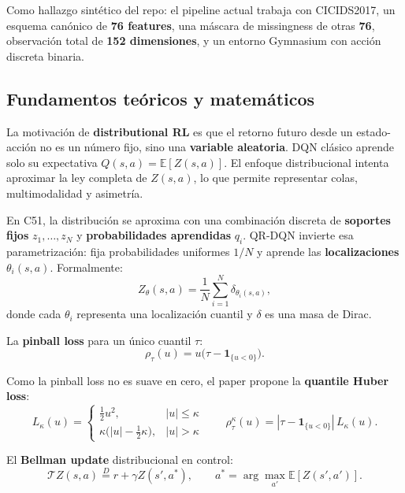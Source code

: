 ﻿\documentclass[12pt,a4paper]{article}
\begin{document}
Como hallazgo sintético del repo: el pipeline actual trabaja con CICIDS2017, un esquema canónico de
\textbf{76 features}, una máscara de missingness de otras \textbf{76}, observación total de
\textbf{152 dimensiones}, y un entorno Gymnasium con acción discreta binaria.

\subsection{Fundamentos teóricos y matemáticos}

La motivación de \textbf{distributional RL} es que el retorno futuro desde un estado-acción no es
un número fijo, sino una \textbf{variable aleatoria}. DQN clásico aprende solo su expectativa
\(Q(s,a)=\mathbb{E}[Z(s,a)]\). El enfoque distribucional intenta aproximar la ley completa de
\(Z(s,a)\), lo que permite representar colas, multimodalidad y asimetría.

En C51, la distribución se aproxima con una combinación discreta de \textbf{soportes fijos}
\(z_1,\dots,z_N\) y \textbf{probabilidades aprendidas} \(q_i\). QR-DQN invierte esa
parametrización: fija probabilidades uniformes \(1/N\) y aprende las \textbf{localizaciones}
\(\theta_i(s,a)\). Formalmente:
\[
  Z_\theta(s,a)=\frac{1}{N}\sum_{i=1}^N \delta_{\theta_i(s,a)},
\]
donde cada \(\theta_i\) representa una localización cuantil y \(\delta\) es una masa de Dirac.

La \textbf{pinball loss} para un único cuantil \(\tau\):
\[
  \rho_\tau(u)=u\bigl(\tau-\mathbf{1}_{\{u<0\}}\bigr).
\]

Como la pinball loss no es suave en cero, el paper propone la \textbf{quantile Huber loss}:
\[
  L_\kappa(u)=
  \begin{cases}
    \tfrac{1}{2}u^2, & |u|\le \kappa \\
    \kappa\bigl(|u|-\tfrac{1}{2}\kappa\bigr), & |u|>\kappa
  \end{cases}
  \qquad
  \rho^\kappa_\tau(u)=|\tau-\mathbf{1}_{\{u<0\}}|\,L_\kappa(u).
\]

El \textbf{Bellman update} distribucional en control:
\[
  \mathcal{T} Z(s,a)\overset{D}{=} r + \gamma Z(s',a^*),
  \qquad
  a^*=\arg\max_{a'}\mathbb{E}[Z(s',a')].
\]
\end{document}
